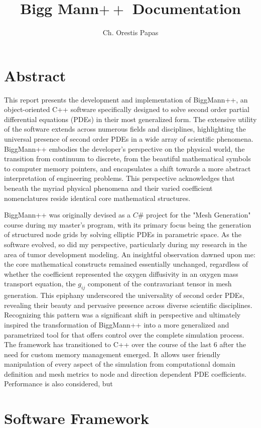\documentclass{article}
\title{Bigg Mann$++$ Documentation}
\author{Ch. Orestis Papas}
\begin{document}
	
	\section{Abstract}
	This report presents the development and implementation of BiggMann++, an object-oriented C++ software specifically designed to solve second order partial differential equations (PDEs) in their most generalized form. The extensive utility of the software extends across numerous fields and disciplines, highlighting the universal presence of second order PDEs in a wide array of scientific phenomena. BiggMann++ embodies the developer's perspective on the physical world, the transition from continuum to discrete, from the beautiful mathematical symbols to computer memory pointers, and encapsulates a shift towards a more abstract interpretation of engineering problems. This perspective acknowledges that beneath the myriad physical phenomena and their varied coefficient nomenclatures reside identical core mathematical structures.
	
	BiggMann++ was originally devised as a $C\#$ project for the "Mesh Generation" course during my master's program, with its primary focus being the generation of structured node grids by solving elliptic PDEs in parametric space. As the software evolved, so did my perspective, particularly during my research in the area of tumor development modeling. An insightful observation dawned upon me: the core mathematical constructs remained essentially unchanged, regardless of whether the coefficient represented the oxygen diffusivity in an oxygen mass transport equation, the $g_{ij}$ component of the contravariant tensor in mesh generation. This epiphany underscored the universality of second order PDEs, revealing their beauty and pervasive presence across diverse scientific disciplines. Recognizing this pattern was a significant shift in perspective and ultimately inspired the transformation of BiggMann++ into a more generalized and parametrized tool for that offers control over the complete simulation process. The framework has transitioned to C++ over the course of the last 6 after the need for custom memory management emerged. It allows user friendly manipulation of every aspect of the simulation from computational domain definition and mesh metrics to node and direction dependent PDE coefficients. Performance is also considered, but 
	

	
	\section{Software Framework}
\end{document}
